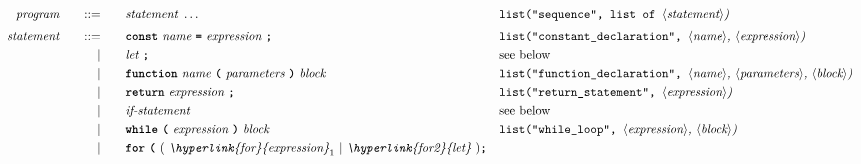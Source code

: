\begin{alignat*}{9}
&& \textit{program}    &&\quad ::= &\quad && \textit{statement} \ \ldots
                                                           && \texttt{list("sequence", list of  } \langle \textit{statement}\rangle \textit{)} \\[1mm]
&& \textit{statement}    &&\quad ::= &\quad && \textbf{\texttt{const}}\  \textit{name} \
                                           \textbf{\texttt{=}}\  \textit{expression} \ \textbf{\texttt{;}}
                                                           && \texttt{list("constant\_declaration",  } \langle \textit{name}\rangle \textit{,  } \langle \textit{expression}\rangle \textit{)} \\
&&                       && |   &\quad && \textit{let} \ \textbf{\texttt{;}}
                                                           &&  \textrm{see below}\\
&&                       && |   &\quad && \textbf{\texttt{function}}\  \textit{name} \
                                   \textbf{\texttt{(}}\  \textit{parameters} \ \textbf{\texttt{)}}\ \textit{block} \quad
                                                           &&  \texttt{list("function\_declaration",  } \langle \textit{name}\rangle \textit{, } \langle \textit{parameters}\rangle \textit{,}\ \langle \textit{block}\rangle \textit{)} \\
&&                       && |   &\quad && \textbf{\texttt{return}}\  \textit{expression} \ \textbf{\texttt{;}}
                                                           && \texttt{list("return\_statement",  } \langle \textit{expression}\rangle \textit{)} \\
&&                       && |   &\quad && \textit{if-statement} \quad
                                                           && \textrm{see below}\\
&&                       && |   &\quad && \textbf{\texttt{while}}\
                                   \textbf{\texttt{(}}\  \textit{expression} \ \textbf{\texttt{)}} \
                                   \textit{block}
                                                           && \texttt{list("while\_loop",  } \langle \textit{expression}\rangle \textit{,  } \langle \textit{block}\rangle \textit{)} \\
&&                       && |   &\quad && \textbf{\texttt{for}}\ \textbf{\texttt{(}} \
                                          (\ \textit{\hyperlink{for}{expression}}_1 \ | \  \textit{\hyperlink{for2}{let}}\ ) \textbf{\texttt{;}} \\

\end{alignat*}
